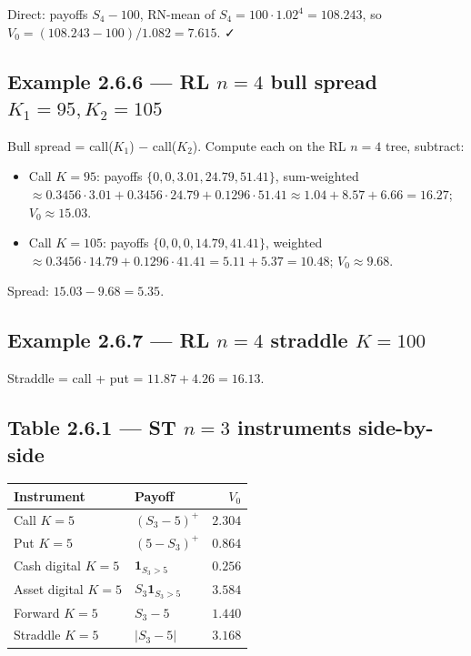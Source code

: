 \documentclass[
  10pt,
  twoside]{book}
\newcounter{none} %
\providecommand{\tightlist}{%
  \setlength{\itemsep}{0pt}\setlength{\parskip}{0pt}}
\begin{document}
Direct: payoffs \(S_4-100\), RN-mean of
\(S_4 = 100\cdot 1.02^4 = 108.243\), so
\(V_0 = (108.243-100)/1.082 = 7.615\). ✓

\subsection{\texorpdfstring{Example 2.6.6 --- RL \(n=4\) bull spread
\(K_1=95, K_2=105\)}{Example 2.6.6 --- RL n=4 bull spread K\_1=95, K\_2=105}}\label{example-2.6.6-rl-n4-bull-spread-k_195-k_2105}

Bull spread = call(\(K_1\)) − call(\(K_2\)). Compute each on the RL
\(n=4\) tree, subtract:

\begin{itemize}
\tightlist
\item
  Call \(K=95\): payoffs \(\{0,0,3.01,24.79,51.41\}\), sum-weighted
  \(\approx 0.3456\cdot 3.01 + 0.3456\cdot 24.79 + 0.1296\cdot 51.41 \approx 1.04 + 8.57 + 6.66 = 16.27\);
  \(V_0\approx 15.03\).
\item
  Call \(K=105\): payoffs \(\{0,0,0,14.79,41.41\}\), weighted
  \(\approx 0.3456\cdot 14.79 + 0.1296\cdot 41.41 = 5.11 + 5.37 = 10.48\);
  \(V_0\approx 9.68\).
\end{itemize}

Spread: \(15.03 - 9.68 = 5.35\).

\subsection{\texorpdfstring{Example 2.6.7 --- RL \(n=4\) straddle
\(K=100\)}{Example 2.6.7 --- RL n=4 straddle K=100}}\label{example-2.6.7-rl-n4-straddle-k100}

Straddle = call + put = \(11.87 + 4.26 = 16.13\).

\subsection{\texorpdfstring{Table 2.6.1 --- ST \(n=3\) instruments
side-by-side}{Table 2.6.1 --- ST n=3 instruments side-by-side}}\label{table-2.6.1-st-n3-instruments-side-by-side}

{\def\LTcaptype{none} %
\begin{table}[H]
\centering
\begin{tabular}{|l|l|r|}
\toprule
Instrument & Payoff & \(V_0\) \\
\midrule



Call \(K=5\) & \((S_3-5)^+\) & \(2.304\) \\
Put \(K=5\) & \((5-S_3)^+\) & \(0.864\) \\
Cash digital \(K=5\) & \(\mathbf 1_{S_3>5}\) & \(0.256\) \\
Asset digital \(K=5\) & \(S_3\mathbf 1_{S_3>5}\) & \(3.584\) \\
Forward \(K=5\) & \(S_3-5\) & \(1.440\) \\
Straddle \(K=5\) & \(\lvert S_3-5\rvert\) & \(3.168\) \\
\bottomrule
\end{tabular}
\end{table}
}
\end{document}
